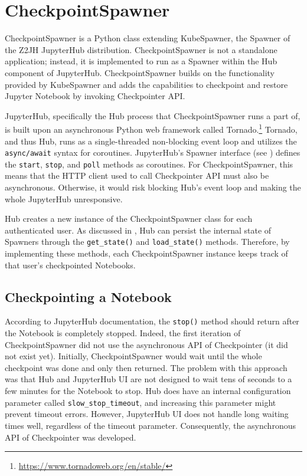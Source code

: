 \documentclass[
  digital,     %
  oneside,     %
  nosansbold,  %
  nocolorbold, %
  lof,         %
  nolot,         %
]{fithesis4}
\begin{document}
\chapter{CheckpointSpawner}
\label{chap:checkpoint_spawner}

CheckpointSpawner is a Python class extending KubeSpawner, the Spawner of the Z2JH JupyterHub distribution. CheckpointSpawner is not a standalone application; instead, it is implemented to run as a Spawner within the Hub component of JupyterHub. CheckpointSpawner builds on the functionality provided by KubeSpawner and adds the capabilities to checkpoint and restore Jupyter Notebook by invoking Checkpointer API. 

JupyterHub, specifically the Hub process that CheckpointSpawner runs a part of, is built upon an asynchronous Python web framework called Tornado.\footnote{\url{https://www.tornadoweb.org/en/stable/}} Tornado, and thus Hub, runs as a single-threaded non-blocking event loop and utilizes the \texttt{async/await} syntax for coroutines. JupyterHub's Spawner interface (see ) defines the \texttt{start}, \texttt{stop}, and \texttt{poll} methods as coroutines. For CheckpointSpawner, this means that the HTTP client used to call Checkpointer API must also be asynchronous. Otherwise, it would risk blocking Hub's event loop and making the whole JupyterHub unresponsive.

Hub creates a new instance of the CheckpointSpawner class for each authenticated user. As discussed in , Hub can persist the internal state of Spawners through the \texttt{get\_state()} and \texttt{load\_state()} methods. Therefore, by implementing these methods, each CheckpointSpawner instance keeps track of that user's checkpointed Notebooks.


\section{Checkpointing a Notebook}
According to JupyterHub documentation, the \texttt{stop()} method should return after the Notebook is completely stopped. Indeed, the first iteration of CheckpointSpawner did not use the asynchronous API of Checkpointer (it did not exist yet). Initially, CheckpointSpawner would wait until the whole checkpoint was done and only then returned. The problem with this approach was that Hub and JupyterHub UI are not designed to wait tens of seconds to a few minutes for the Notebook to stop. Hub does have an internal configuration parameter called \texttt{slow\_stop\_timeout}, and increasing this parameter might prevent timeout errors. However, JupyterHub UI does not handle long waiting times well, regardless of the timeout parameter. Consequently, the asynchronous API of Checkpointer was developed.
\end{document}
